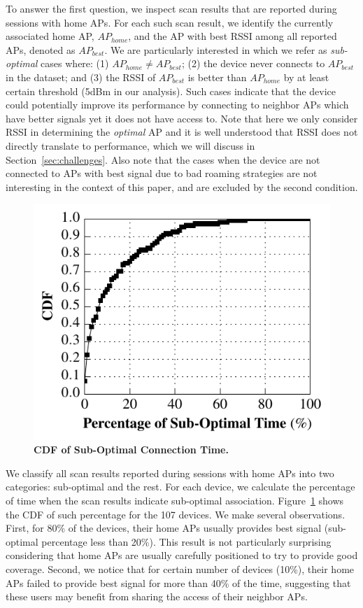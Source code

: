 To answer the first question, we inspect scan results that are reported during
\wifi{} sessions with home APs. For each such scan result, we identify the
currently associated home AP, $AP_{home}$, and the AP with best RSSI among all
reported APs, denoted as $AP_{best}$. We are particularly interested in which we
refer as \textit{sub-optimal} cases where: (1) $AP_{home} \neq AP_{best}$; (2)
the device never connects to $AP_{best}$ in the dataset; and (3) the RSSI of
$AP_{best}$ is better than $AP_{home}$ by at least certain threshold (5dBm in
our analysis). Such cases indicate that the device could potentially improve its
\wifi{} performance by connecting to neighbor APs which have better signals yet it
does not have access to. Note that here we only consider RSSI in determining the
\textit{optimal} AP and it is well understood that RSSI does not directly translate
to \wifi{} performance, which we will discuss in Section~\ref{sec:challenges}.
Also note that the cases when the device are not connected to APs with best
signal due to bad roaming strategies are not interesting in the context of this
paper, and are excluded by the second condition.

\begin{figure}[t]
  \centering
  \includegraphics[width=\columnwidth]{./figures/HomeAPSessionRSSI.pdf}
  \caption{\textbf{CDF of Sub-Optimal Connection Time.}}
  \label{fig:suboptimal}
\end{figure}

We classify all scan results reported during \wifi{} sessions with home APs into
two categories: sub-optimal and the rest. For each device, we calculate the
percentage of time when the scan results indicate sub-optimal association.
Figure~\ref{fig:suboptimal} shows the CDF of such percentage for 
the 107 devices. We make several observations. First, for 80\% of the devices,
their home APs usually provides best signal (sub-optimal percentage less than
20\%). This result is not particularly surprising considering that home APs are
usually carefully positioned to try to provide good coverage. Second, we notice
that for certain number of devices (10\%), their home APs failed to provide best
signal for more than 40\% of the time, suggesting that these users may benefit
from sharing the \wifi{} access of their neighbor APs.

